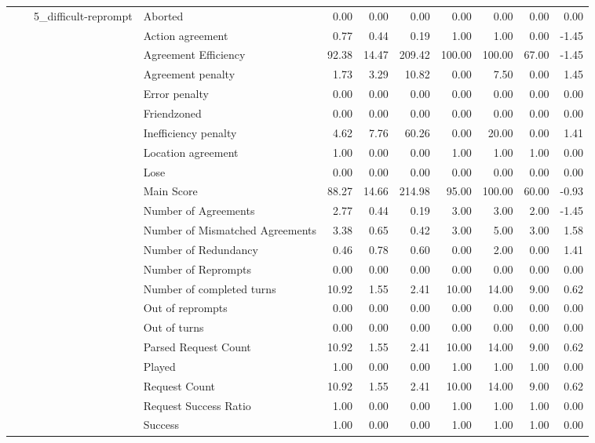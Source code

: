 \begin{tabular}{llllrrrrrrr}
\cline{3-11}
 &  & \multirow[t]{27}{*}{5_difficult-reprompt} & Aborted & 0.00 & 0.00 & 0.00 & 0.00 & 0.00 & 0.00 & 0.00 \\
 &  &  & Action agreement & 0.77 & 0.44 & 0.19 & 1.00 & 1.00 & 0.00 & -1.45 \\
 &  &  & Agreement Efficiency & 92.38 & 14.47 & 209.42 & 100.00 & 100.00 & 67.00 & -1.45 \\
 &  &  & Agreement penalty & 1.73 & 3.29 & 10.82 & 0.00 & 7.50 & 0.00 & 1.45 \\
 &  &  & Error penalty & 0.00 & 0.00 & 0.00 & 0.00 & 0.00 & 0.00 & 0.00 \\
 &  &  & Friendzoned & 0.00 & 0.00 & 0.00 & 0.00 & 0.00 & 0.00 & 0.00 \\
 &  &  & Inefficiency penalty & 4.62 & 7.76 & 60.26 & 0.00 & 20.00 & 0.00 & 1.41 \\
 &  &  & Location agreement & 1.00 & 0.00 & 0.00 & 1.00 & 1.00 & 1.00 & 0.00 \\
 &  &  & Lose & 0.00 & 0.00 & 0.00 & 0.00 & 0.00 & 0.00 & 0.00 \\
 &  &  & Main Score & 88.27 & 14.66 & 214.98 & 95.00 & 100.00 & 60.00 & -0.93 \\
 &  &  & Number of Agreements & 2.77 & 0.44 & 0.19 & 3.00 & 3.00 & 2.00 & -1.45 \\
 &  &  & Number of Mismatched Agreements & 3.38 & 0.65 & 0.42 & 3.00 & 5.00 & 3.00 & 1.58 \\
 &  &  & Number of Redundancy & 0.46 & 0.78 & 0.60 & 0.00 & 2.00 & 0.00 & 1.41 \\
 &  &  & Number of Reprompts & 0.00 & 0.00 & 0.00 & 0.00 & 0.00 & 0.00 & 0.00 \\
 &  &  & Number of completed turns & 10.92 & 1.55 & 2.41 & 10.00 & 14.00 & 9.00 & 0.62 \\
 &  &  & Out of reprompts & 0.00 & 0.00 & 0.00 & 0.00 & 0.00 & 0.00 & 0.00 \\
 &  &  & Out of turns & 0.00 & 0.00 & 0.00 & 0.00 & 0.00 & 0.00 & 0.00 \\
 &  &  & Parsed Request Count & 10.92 & 1.55 & 2.41 & 10.00 & 14.00 & 9.00 & 0.62 \\
 &  &  & Played & 1.00 & 0.00 & 0.00 & 1.00 & 1.00 & 1.00 & 0.00 \\
 &  &  & Request Count & 10.92 & 1.55 & 2.41 & 10.00 & 14.00 & 9.00 & 0.62 \\
 &  &  & Request Success Ratio & 1.00 & 0.00 & 0.00 & 1.00 & 1.00 & 1.00 & 0.00 \\
 &  &  & Success & 1.00 & 0.00 & 0.00 & 1.00 & 1.00 & 1.00 & 0.00 \\

\end{tabular}
